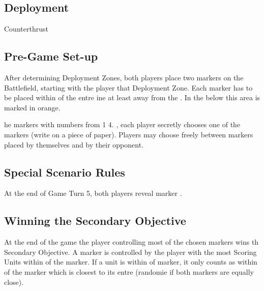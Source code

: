 
\label{Misdirections}


\subsection*{Deployment}

 Counterthrust

\subsection*{Pre-Game Set-up}

After determining Deployment Zones, both players  place two markers  on the Battlefield, starting with the player that  Deployment Zone. Each marker has to be placed  within  of the entre ine  at least  away from the . In the  below\rewordedrule{,} this area is marked in orange. 

he markers with numbers from 1  4. , each player secretly chooses one of the markers (write  on a piece of paper). Players may choose freely between markers placed by themselves and by their opponent.


\subsection*{Special Scenario Rules}

At the end of Game Turn 5, both players reveal  marker . 

\subsection*{Winning the Secondary Objective}

At the end of the game\rewordedrule{,} the player controlling most of the chosen markers wins th Secondary Objective. A marker is controlled by the player with the most Scoring Units within  of the  marker. If a unit is within  of  marker, it only counts as within  of the  marker which is closest to its entre (randomie if both markers are equally close).
